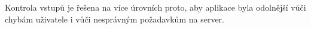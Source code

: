 \documentclass[czech, oth, kiv, he, pdf, viewonly]{fasthesis}
\begin{document}
Kontrola vstupů je řešena na více úrovních proto, aby aplikace byla
odolnější vůči chybám uživatele i vůči nesprávným požadavkům na server.










\end{document}
